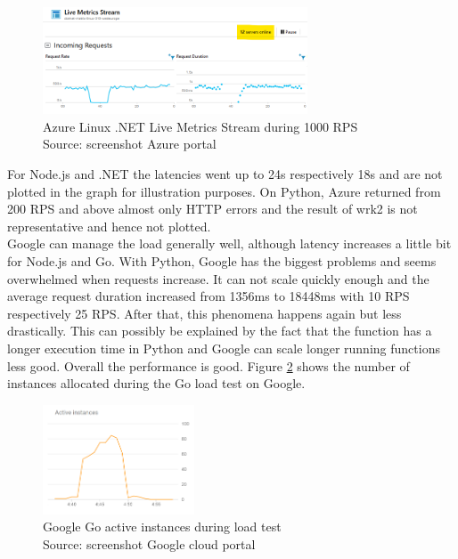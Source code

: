 \begin{figure}[htp]
\begin{center}
\includegraphics[width=0.7\textwidth]{bilder/azure_dotnet_1000.png}
\captionsetup{justification=centering, labelfont=bf}
\caption[Azure Linux .NET Live Metrics Stream during 1000 RPS]{Azure Linux .NET Live Metrics Stream during 1000 RPS\\Source: screenshot Azure portal}
\label{fig:live_metrics_stream}
\end{center}
\end{figure}

For Node.js and .NET the latencies went up to 24s respectively 18s and are not plotted in the graph for illustration purposes. On Python, Azure returned from 200 \gls{RPS} and above almost only \gls{HTTP} errors and the result of wrk2 is not representative and hence not plotted.\\
Google can manage the load generally well, although latency increases a little bit for Node.js and Go. With Python, Google has the biggest problems and seems overwhelmed when requests increase. It can not scale quickly enough and the average request duration increased from 1356ms to 18448ms with 10 \gls{RPS} respectively 25 \gls{RPS}. After that, this phenomena happens again but less drastically. This can possibly be explained by the fact that the function has a longer execution time in Python and Google can scale longer running functions less good. Overall the performance is good. Figure \ref{fig:google_graph_go} shows the number of instances allocated during the Go load test on Google.

\begin{figure}[htp]
\begin{center}
\includegraphics[width=0.4\textwidth]{bilder/Google_Go_Instances.png}
\captionsetup{justification=centering, labelfont=bf}
\caption[Google Go active instances during load test]{Google Go active instances during load test\\Source: screenshot Google cloud portal}
\label{fig:google_graph_go}
\end{center}
\end{figure}

